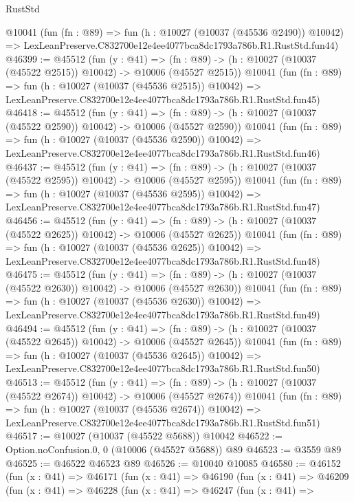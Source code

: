 \begin{lexlean}{RustStd}
\begin{coremodule}
    @10041
    (fun (fn : @89) =>
    fun (h : @10027 (@10037 (@45536 @2490)) @10042) =>
    LexLeanPreserve.C832700e12e4ee4077bca8dc1793a786b.R1.RustStd.fun44)
@46399 := @45512
    (fun (y : @41) =>
    (fn : @89) -> (h : @10027 (@10037 (@45522 @2515)) @10042) -> @10006 (@45527 @2515))
    @10041
    (fun (fn : @89) =>
    fun (h : @10027 (@10037 (@45536 @2515)) @10042) =>
    LexLeanPreserve.C832700e12e4ee4077bca8dc1793a786b.R1.RustStd.fun45)
@46418 := @45512
    (fun (y : @41) =>
    (fn : @89) -> (h : @10027 (@10037 (@45522 @2590)) @10042) -> @10006 (@45527 @2590))
    @10041
    (fun (fn : @89) =>
    fun (h : @10027 (@10037 (@45536 @2590)) @10042) =>
    LexLeanPreserve.C832700e12e4ee4077bca8dc1793a786b.R1.RustStd.fun46)
@46437 := @45512
    (fun (y : @41) =>
    (fn : @89) -> (h : @10027 (@10037 (@45522 @2595)) @10042) -> @10006 (@45527 @2595))
    @10041
    (fun (fn : @89) =>
    fun (h : @10027 (@10037 (@45536 @2595)) @10042) =>
    LexLeanPreserve.C832700e12e4ee4077bca8dc1793a786b.R1.RustStd.fun47)
@46456 := @45512
    (fun (y : @41) =>
    (fn : @89) -> (h : @10027 (@10037 (@45522 @2625)) @10042) -> @10006 (@45527 @2625))
    @10041
    (fun (fn : @89) =>
    fun (h : @10027 (@10037 (@45536 @2625)) @10042) =>
    LexLeanPreserve.C832700e12e4ee4077bca8dc1793a786b.R1.RustStd.fun48)
@46475 := @45512
    (fun (y : @41) =>
    (fn : @89) -> (h : @10027 (@10037 (@45522 @2630)) @10042) -> @10006 (@45527 @2630))
    @10041
    (fun (fn : @89) =>
    fun (h : @10027 (@10037 (@45536 @2630)) @10042) =>
    LexLeanPreserve.C832700e12e4ee4077bca8dc1793a786b.R1.RustStd.fun49)
@46494 := @45512
    (fun (y : @41) =>
    (fn : @89) -> (h : @10027 (@10037 (@45522 @2645)) @10042) -> @10006 (@45527 @2645))
    @10041
    (fun (fn : @89) =>
    fun (h : @10027 (@10037 (@45536 @2645)) @10042) =>
    LexLeanPreserve.C832700e12e4ee4077bca8dc1793a786b.R1.RustStd.fun50)
@46513 := @45512
    (fun (y : @41) =>
    (fn : @89) -> (h : @10027 (@10037 (@45522 @2674)) @10042) -> @10006 (@45527 @2674))
    @10041
    (fun (fn : @89) =>
    fun (h : @10027 (@10037 (@45536 @2674)) @10042) =>
    LexLeanPreserve.C832700e12e4ee4077bca8dc1793a786b.R1.RustStd.fun51)
@46517 := @10027 (@10037 (@45522 @5688)) @10042
@46522 := Option.noConfusion.{0, 0} (@10006 (@45527 @5688)) @89
@46523 := @3559 @89
@46525 := @46522 @46523 @89
@46526 := @10040 @10085
@46580 := @46152
    (fun (x : @41) =>
    @46171
      (fun (x : @41) =>
      @46190
        (fun (x : @41) =>
        @46209
          (fun (x : @41) =>
          @46228
            (fun (x : @41) =>
            @46247
              (fun (x : @41) =>

\end{coremodule}
\end{lexlean}
